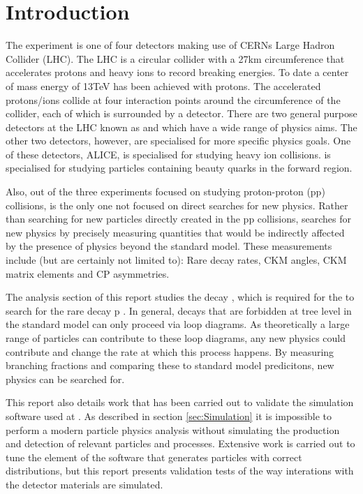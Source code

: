 
\section{Introduction}
\label{sec:Introduction}
The \lhcb experiment is one of four detectors making use of CERNs Large Hadron Collider (LHC). The LHC is a circular collider with a 27km circumference that accelerates protons and heavy ions to record breaking energies.  To date a center of mass energy of 13TeV has been achieved with protons.  The accelerated protons/ions collide at four interaction points around the circumference of the collider, each of which is surrounded by a detector.  There are two general purpose detectors at the LHC known as \atlas and \cms which have a wide range of physics aims.  The other two detectors, however, are specialised for more specific physics goals.  One of these detectors, ALICE, is specialised for studying heavy ion collisions.  \lhcb is specialised for studying particles containing beauty quarks in the forward region.

Also, out of the three experiments focused on studying proton-proton (pp) collisions, \lhcb is the only one not focused on direct searches for new physics.  Rather than searching for new particles directly created in the pp collisions, \lhcb searches for new physics by precisely measuring quantities that would be indirectly affected by the presence of physics beyond the standard model.  These measurements include (but are certainly not limited to): Rare decay rates, CKM angles, CKM matrix elements and CP asymmetries.

The analysis section of this report studies the decay \Bd \to \Kstar \etaz, which is required for the to search for the rare decay \Lb \to p \Km \etaz.  In general, decays that are forbidden at tree level in the standard model can only proceed via loop diagrams.  As theoretically a large range of particles can contribute to these loop diagrams, any new physics could contribute and change the rate at which this process happens.  By measuring branching fractions and comparing these to standard model predicitons, new physics can be searched for.

This report also details work that has been carried out to validate the simulation software used at \lhcb. As described in section \ref{sec:Simulation} it is impossible to perform a modern particle physics analysis without simulating the production and detection of relevant particles and processes.  Extensive work is carried out to tune the element of the software that generates particles with correct distributions, but this report presents validation tests of the way interations with the detector materials are simulated.




